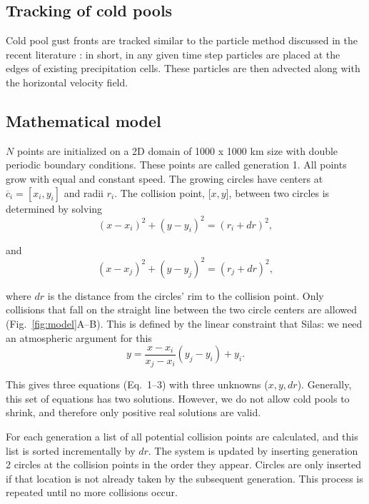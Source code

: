 \documentclass[reprint,amsmath,amssymb]{revtex4-1}
\begin{document}
\subsection{Tracking of cold pools}\label{sec:cp_tracking}
Cold pool gust fronts are tracked similar to the particle method discussed in the recent literature \cite{haerter2018reconciling}:
in short, in any given time step particles are placed at the edges of existing precipitation cells. These particles are then advected along with the horizontal velocity field.

\subsection{Mathematical model}\label{sec:math_model}
$N$ points are initialized on a 2D domain of 1000 x 1000 km size with double periodic boundary conditions. These points are called generation 1. All points grow with equal and constant speed. The growing circles have centers at $\overline{c}_i=[x_i, y_i]$ and radii $r_i$. The collision point, [$x, y$], between two circles is determined by solving
\begin{equation}
    (x-x_i)^2 + (y-y_i)^2 = (r_i+dr)^2,
\end{equation}

and 
\begin{equation}
    (x-x_j)^2 + (y-y_j)^2 = (r_j+dr)^2,
\end{equation}

where $dr$ is the distance from the circles' rim to the collision point. Only collisions that fall on the straight line between the two circle centers are allowed (Fig.~\ref{fig:model}A--B). This is defined by the linear constraint that {\color{red} Silas: we need an atmospheric argument for this}
\begin{equation}
    y = \frac{x - x_i}{x_j - x_i} (y_j - y_i) + y_i.
\end{equation}

This gives three equations (Eq.~1--3) with three unknowns ($x, y, dr$). Generally, this set of equations has two solutions. However, we do not allow cold pools to shrink, and therefore only positive real solutions are valid.

For each generation a list of all potential collision points are calculated, and this list is sorted incrementally by $dr$. The system is updated by inserting generation 2 circles at the collision points in the order they appear. Circles are only inserted if that location is not already taken by the subsequent generation. This process is repeated until no more collisions occur.
\end{document}
